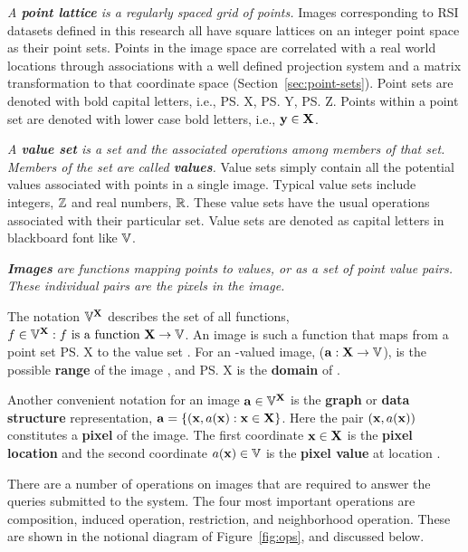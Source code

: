 \documentclass{ucdthesis}       %
\begin{document}
\emph{A {\bf point lattice } is a regularly spaced grid of points.}
Images corresponding to \ac{RSI} datasets defined in this research all
have square lattices on an integer point space as their point sets.
Points in the image space are correlated with a real world locations
through associations with a well defined projection system and a
matrix transformation to that coordinate space
(Section~\ref{sec:point-sets}).  Point sets are denoted with bold
capital letters, i.e., \ps{X}, \ps{Y}, \ps{Z}.  Points within a point
set are denoted with lower case bold letters, i.e., ${\bf{y}} \in
{\ensuremath{\bf{X}}}$.


\emph{A {\bf value set} is a set and the associated operations among
  members of that set.  Members of the set are called {\bf values}.}
Value sets simply contain all the potential values associated with
points in a single image.  Typical value sets include integers,
${\mathbb{Z}}$ and real numbers, ${\mathbb{R}}$.  These value sets have the usual
operations associated with their particular set.  Value sets are
denoted as capital letters in blackboard font like ${\mathbb{V}}$.

\emph{{\bf Images} are functions mapping points to values, or as a set
  of point value pairs.  These individual pairs are the \emph{pixels}
  in the image.}

The notation ${\mathbb{V}}^{{\bf{X}}}$ describes the set of all functions, $f
\in {\ensuremath{\mathbb{V}}}^{{\bf{X}}}: f \text{ is a function } {\ensuremath{\bf{X}}} \rightarrow {\ensuremath{\mathbb{V}}}$.
An image is such a function that maps from a point set \ps{X} to the
value set .  For an -valued image, (${\bf{a}}: {\bf{X}} \to
{\ensuremath{\mathbb{V}}}$),  is the possible {\bf range} of the image , and
\ps{X} is the {\bf domain} of .

Another convenient notation for an image ${\bf{a}} \in {\ensuremath{\mathbb{V}}}^{{\bf{X}}}$ is
the {\bf graph } or {\bf data structure } representation, ${\bf{a}} =
\{({\bf{x}},a({\bf{x}}) : {\bf{x}} \in {\ensuremath{\bf{X}}}\}$.  Here the pair
$({\bf{x}},a({\bf{x}}))$ constitutes a {\bf pixel} of the image.  The
first coordinate ${\bf{x}} \in {\ensuremath{\bf{X}}}$ is the {\bf pixel location} and
the second coordinate $a({\bf{x}}) \in {\ensuremath{\mathbb{V}}}$ is the {\bf pixel
  value} at location .

There are a number of operations on images that are required to answer
the queries submitted to the system.  The four most important
operations are composition, induced operation, restriction, and
neighborhood operation.  These are shown in the notional diagram of
Figure~\ref{fig:ops}, and discussed below.
\end{document}
